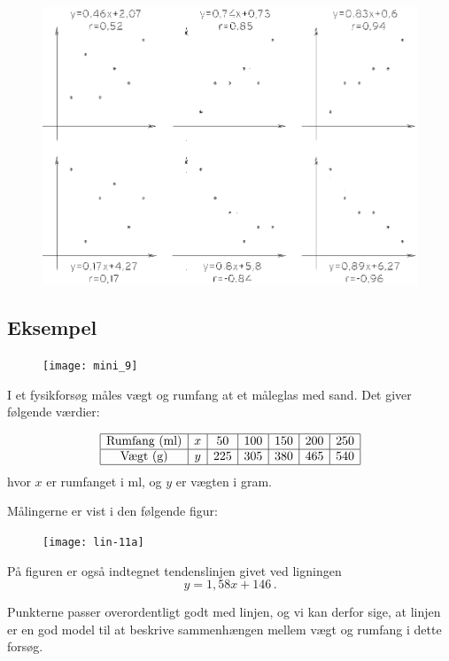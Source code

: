 \documentclass[12pt,oneside,a4paper]{article}
\begin{document}
\begin{figure}[H]
    \centering
    \includegraphics[width=\textwidth]{fig57}
    \caption{}
\end{figure}

\subsection{Eksempel}
\begin{figure}[H]
    \centering
    \texttt{[image: mini\_9]}
    \caption{}
\end{figure}
I et fysikforsøg måles vægt og rumfang at et måleglas med sand. Det giver følgende værdier:

\[
\begin{array}{|c|c|c|c|c|c|c|}
    \hline
    \mbox{Rumfang (ml)} & x &  50 &  100 &  150 &  200 &  250  \\
    \hline
    \mbox{Vægt (g)} & y &  225 &   305 &  380 &  465 &  540 \\
    \hline
\end{array}
\]
hvor $x$ er rumfanget i ml, og $y$ er vægten i gram.

Målingerne er vist i den følgende figur:

\begin{figure}[H]
    \centering
    \texttt{[image: lin-11a]}
    \caption{}
\end{figure}

På figuren er også indtegnet tendenslinjen givet ved ligningen
\[
    y=1,58 x + 146 \,.
\]

Punkterne passer overordentligt godt med linjen, og vi kan derfor sige, at linjen er en god model
til at beskrive sammenhængen mellem vægt og rumfang i dette forsøg.
\end{document}

